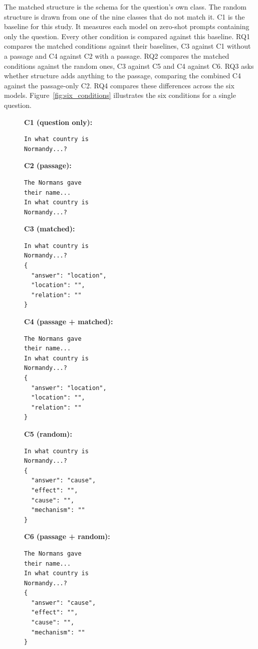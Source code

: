 \documentclass[master]{thesis}
\newcommand{\fref}[1]{Figure~\ref{#1}}   %
\begin{document}
The matched structure is the schema for the question's own class. The random structure is drawn from one of the nine classes that do not match it. C1 is the baseline for this study. It measures each model on zero-shot prompts containing only the question. Every other condition is compared against this baseline. RQ1 compares the matched conditions against their baselines, C3 against C1 without a passage and C4 against C2 with a passage. RQ2 compares the matched conditions against the random ones, C3 against C5 and C4 against C6. RQ3 asks whether structure adds anything to the passage, comparing the combined C4 against the passage-only C2. RQ4 compares these differences across the six models. \fref{fig:six_conditions} illustrates the six conditions for a single question.

\begin{figure}[ht]
\centering

\begin{minipage}[t]{0.30\textwidth}
\textbf{C1 (question only):}
\begin{verbatim}
In what country is
Normandy...?
\end{verbatim}
\end{minipage}
\hfill
\begin{minipage}[t]{0.30\textwidth}
\textbf{C2 (passage):}
\begin{verbatim}
The Normans gave
their name...
In what country is
Normandy...?
\end{verbatim}
\end{minipage}
\hfill
\begin{minipage}[t]{0.30\textwidth}
\textbf{C3 (matched):}
\begin{verbatim}
In what country is
Normandy...?
{
  "answer": "location",
  "location": "",
  "relation": ""
}
\end{verbatim}
\end{minipage}

\vspace{1.5em}

\begin{minipage}[t]{0.30\textwidth}
\textbf{C4 (passage + matched):}
\begin{verbatim}
The Normans gave
their name...
In what country is
Normandy...?
{
  "answer": "location",
  "location": "",
  "relation": ""
}
\end{verbatim}
\end{minipage}
\hfill
\begin{minipage}[t]{0.30\textwidth}
\textbf{C5 (random):}
\begin{verbatim}
In what country is
Normandy...?
{
  "answer": "cause",
  "effect": "",
  "cause": "",
  "mechanism": ""
}
\end{verbatim}
\end{minipage}
\hfill
\begin{minipage}[t]{0.30\textwidth}
\textbf{C6 (passage + random):}
\begin{verbatim}
The Normans gave
their name...
In what country is
Normandy...?
{
  "answer": "cause",
  "effect": "",
  "cause": "",
  "mechanism": ""
}
\end{verbatim}
\end{minipage}


\end{figure}
\end{document}
